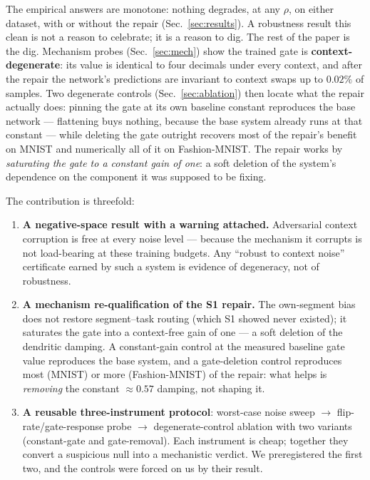 \documentclass[review,12pt,number]{elsarticle}
\begin{document}
The empirical answers are monotone: nothing degrades, at any $\rho$, on
either dataset, with or without the repair
(Sec.~\ref{sec:results}). A robustness result this clean is not a
reason to celebrate; it is a reason to dig. The rest of the paper is the
dig. Mechanism probes (Sec.~\ref{sec:mech}) show the trained gate is
\textbf{context-degenerate}: its value is identical to four decimals
under every context, and after the repair the network's predictions are
invariant to context swaps up to $0.02\%$ of samples. Two degenerate
controls (Sec.~\ref{sec:ablation}) then locate what the repair actually
does: pinning the gate at its own baseline constant reproduces the base
network --- flattening buys nothing, because the base system already
runs at that constant --- while deleting the gate outright recovers most
of the repair's benefit on MNIST and numerically all of it on
Fashion-MNIST. The repair works by \emph{saturating the gate to a
constant gain of one}: a soft deletion of the system's dependence on the
component it was supposed to be fixing.

The contribution is threefold:
\begin{enumerate}
\item \textbf{A negative-space result with a warning attached.}
Adversarial context corruption is free at every noise level --- because
the mechanism it corrupts is not load-bearing at these training budgets.
Any ``robust to context noise'' certificate earned by such a system is
evidence of degeneracy, not of robustness.
\item \textbf{A mechanism re-qualification of the S1 repair.} The
own-segment bias does not restore segment--task routing (which S1 showed
never existed); it saturates the gate into a context-free gain of one ---
a soft deletion of the dendritic damping. A constant-gain control at the
measured baseline gate value reproduces the base system, and a
gate-deletion control reproduces most (MNIST) or more (Fashion-MNIST) of
the repair: what helps is \emph{removing} the constant ${\approx}0.57$
damping, not shaping it.
\item \textbf{A reusable three-instrument protocol}: worst-case noise
sweep $\to$ flip-rate/gate-response probe $\to$ degenerate-control
ablation with two variants (constant-gate and gate-removal). Each
instrument is cheap; together they convert a suspicious null into a
mechanistic verdict. We preregistered the first two, and the controls
were forced on us by their result.
\end{enumerate}
\end{document}
